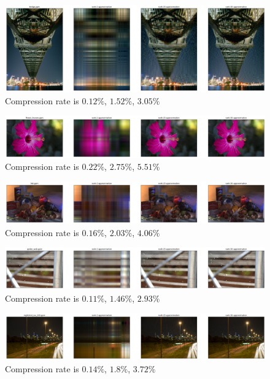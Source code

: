 \begin{figure}[H]
  \centering
  \includegraphics[width=\linewidth]{bridge_ex.png}
  \caption{Compression rate is $0.12\%$, $1.52\%$, $3.05\%$}
  \label{fig:exmp_2}
\end{figure}

\begin{figure}[H]
  \centering
  \includegraphics[width=\linewidth]{flower_foveon_ex.png}
  \caption{Compression rate is $0.22\%$, $2.75\%$, $5.51\%$}
  \label{fig:exmp_4}
\end{figure}

\begin{figure}[H]
  \centering
  \includegraphics[width=\linewidth]{hdr.png}
  \caption{Compression rate is $0.16\%$, $2.03\%$, $4.06\%$}
  \label{fig:exmp_5}
\end{figure}

\begin{figure}[H]
  \centering
  \includegraphics[width=\linewidth]{spider_web.png}
  \caption{Compression rate is $0.11\%$, $1.46\%$, $2.93\%$}
  \label{fig:exmp_6}
\end{figure}

\begin{figure}[H]
  \centering
  \includegraphics[width=\linewidth]{night_shot_iso_100_ex.png}
  \caption{Compression rate is $0.14\%$, $1.8\%$, $3.72\%$}
  \label{fig:exmp_7}
\end{figure}

